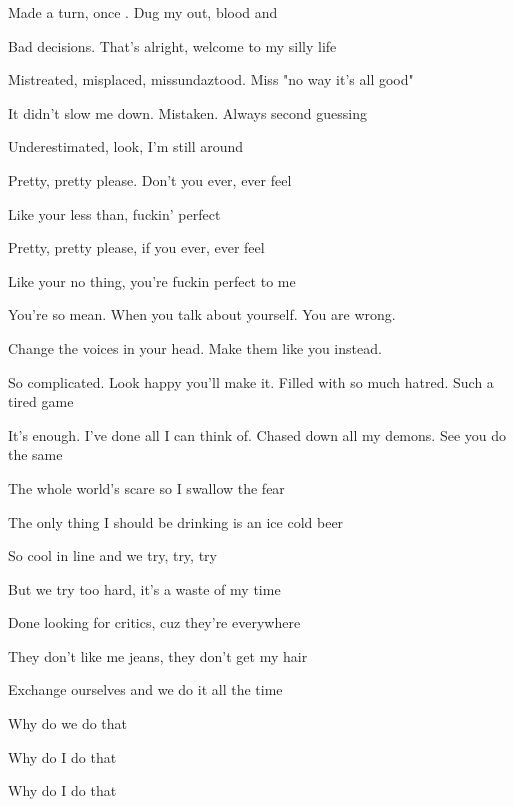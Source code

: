 

\zs
 Made a  turn, once . Dug my  out, blood and 

Bad decisions. That's alright, welcome to my silly life

Mistreated, misplaced, missundaztood. Miss "no way it's all good"

It didn't slow me down. Mistaken. Always second guessing

Underestimated, look, I'm still around
\ks

\zr
Pretty, pretty please. Don't you ever, ever feel

Like your less than, fuckin' perfect

Pretty, pretty please, if you ever, ever feel

Like your no thing, you're fuckin perfect to me
\kr

\zs
You're so mean. When you talk about yourself. You are wrong. 

Change the voices in your head. Make them like you instead.

So complicated. Look happy you'll make it. Filled with so much hatred. Such a tired game

It's enough. I've done all I can think of. Chased down all my demons. See you do the same
\ks

\zr
\kr

\zs
The whole world's scare so I swallow the fear

The only thing I should be drinking is an ice cold beer

So cool in line and we try, try, try

But we try too hard, it's a waste of my time

Done looking for critics, cuz they're everywhere

They don't like me jeans, they don't get my hair

Exchange ourselves and we do it all the time

Why do we do that

Why do I do that

Why do I do that
\ks

\zr \kr

\kp
